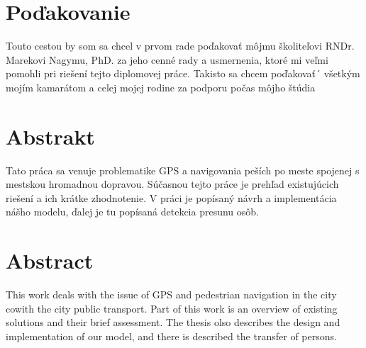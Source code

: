 \documentclass[12pt, a4paper, oneside]{book}
\begin{document}
\chapter*{Poďakovanie}\label{chap:thank_you}
Touto cestou by som sa chcel v prvom rade poďakovať môjmu školiteľovi
RNDr. Marekovi Nagymu, PhD. za jeho cenné rady a usmernenia, ktoré mi veľmi pomohli pri
riešení tejto diplomovej práce. Takisto sa chcem poďakovať´ všetkým mojím kamarátom a
celej mojej rodine za podporu počas môjho štúdia
\vfill\eject 

\chapter*{Abstrakt}\label{chap:abstract_sk}
Tato práca sa venuje problematike GPS a navigovania peších po meste spojenej
s mestskou hromadnou dopravou. Súčasnou tejto práce je prehľad existujúcich riešení a ich
krátke zhodnotenie. V práci je popísaný návrh a implementácia nášho modelu, ďalej je tu
popísaná detekcia presunu osôb.
\vfill\eject 

\chapter*{Abstract}\label{chap:abstract_en}
This work deals with the issue of GPS and pedestrian navigation in the city cowith the
city public transport. Part of this work is an overview of existing solutions and their brief
assessment. The thesis olso describes the design and implementation of our model, and there
is described the transfer of persons.
\vfill\eject 

\tableofcontents

\mainmatter





\backmatter

\nocite{*}



\end{document}
